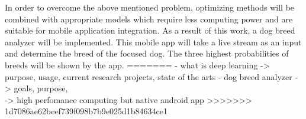 In order to overcome the above mentioned problem, optimizing methods will be combined with appropriate models which require less computing power and are suitable for mobile application integration. As a result of this work, a dog breed analyzer will be implemented. This mobile app will take a live stream as an input and determine the breed of the focused dog. The three highest probabilities of breeds will be shown by the app.
=======
		- what is deep learning -> purpose, usage, current research projects, state of the arts
		- dog breed analyzer -> goals, purpose, \\
		-> high perfomance computing but native android app
>>>>>>> 1d7086ae62beef739f098b7b9e025d1b84634ce1
	